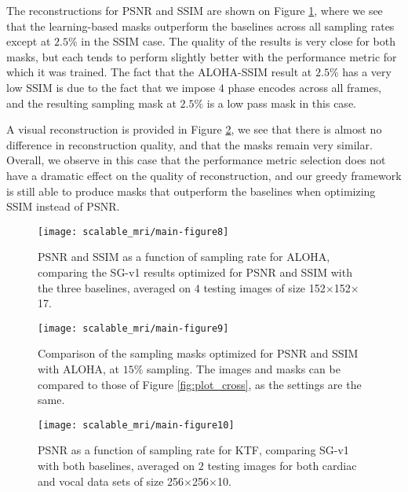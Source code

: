 The reconstructions for PSNR and SSIM are shown on Figure \ref{fig:plot_ssim}, where we see that the learning-based masks outperform the baselines across all sampling rates except at $2.5\%$ in the SSIM case. The quality of the results is very close for both masks, but each tends to perform slightly better with the performance metric for which it was trained. The fact that the ALOHA-SSIM result at $2.5\%$ has a very low SSIM is due to the fact that we impose $4$ phase encodes across all frames, and the resulting sampling mask at $2.5\%$ is a low pass mask in this case.

A visual reconstruction is provided in Figure \ref{fig:ssim}, we see that there is almost no difference in reconstruction quality, and that the masks remain very similar. Overall, we observe in this case that the performance metric selection does not have a dramatic effect on the quality of reconstruction, and our greedy framework is still able to produce masks that outperform the baselines when optimizing SSIM instead of PSNR. 

\begin{figure}[!t]
    \centering
    \texttt{[image: scalable\_mri/main-figure8]}
    \caption{PSNR and SSIM as a function of sampling rate for ALOHA, comparing the SG-v1 results optimized for PSNR and SSIM with the three baselines, averaged on $4$ testing images of size 152$\times$152$\times$17.}\label{fig:plot_ssim}
\end{figure}
\begin{figure}[!t]
    \centering
    \texttt{[image: scalable\_mri/main-figure9]}
    \caption{Comparison of the sampling masks optimized for PSNR and SSIM with ALOHA, at $15\%$ sampling. The images and masks can be compared to those of Figure \ref{fig:plot_cross}, as the settings are the same.} \label{fig:ssim}
\end{figure}

\begin{figure}[!t]
    \centering
    \texttt{[image: scalable\_mri/main-figure10]}
    \caption{PSNR as a function of sampling rate for KTF, comparing SG-v1 with both baselines, averaged on $2$ testing images for both cardiac and vocal data sets of size 256$\times$256$\times$10.}\label{fig:psnr_anat}
\end{figure}

